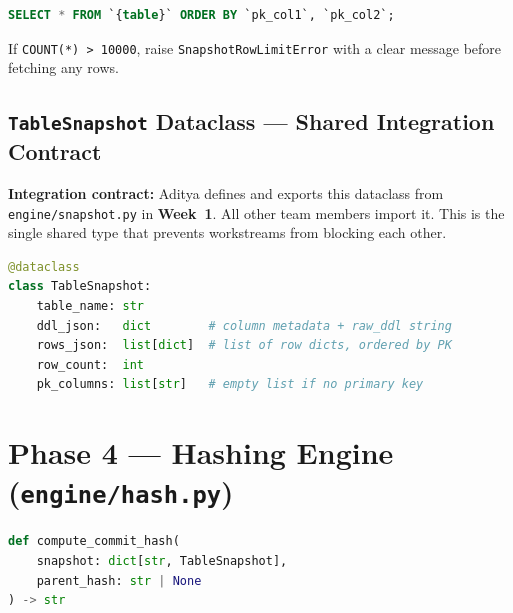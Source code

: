 \documentclass[12pt, a4paper]{article}
\begin{document}
\begin{tcolorbox}[commandbox, title=Row Capture Query (deterministic ordering)]
\begin{lstlisting}[language=SQL]
SELECT * FROM `{table}` ORDER BY `pk_col1`, `pk_col2`;
\end{lstlisting}
\textcolor{codetext}{\small If \texttt{COUNT(*) > 10000}, raise
\texttt{SnapshotRowLimitError} with a clear message before fetching any rows.}
\end{tcolorbox}

\subsection{\texttt{TableSnapshot} Dataclass --- Shared Integration Contract}

\begin{tcolorbox}[fixbox]
\textbf{Integration contract:} Aditya defines and exports this dataclass from
\texttt{engine/snapshot.py} in \textbf{Week~1}. All other team members import
it. This is the single shared type that prevents workstreams from blocking
each other.
\end{tcolorbox}

\begin{tcolorbox}[commandbox, title=\texttt{TableSnapshot} Dataclass]
\begin{lstlisting}[language=Python]
@dataclass
class TableSnapshot:
    table_name: str
    ddl_json:   dict        # column metadata + raw_ddl string
    rows_json:  list[dict]  # list of row dicts, ordered by PK
    row_count:  int
    pk_columns: list[str]   # empty list if no primary key
\end{lstlisting}
\end{tcolorbox}

\section{Phase 4 --- Hashing Engine (\texttt{engine/hash.py})}

\begin{tcolorbox}[commandbox, title=Function Signature]
\begin{lstlisting}[language=Python]
def compute_commit_hash(
    snapshot: dict[str, TableSnapshot],
    parent_hash: str | None
) -> str
\end{lstlisting}
\end{tcolorbox}
\end{document}
